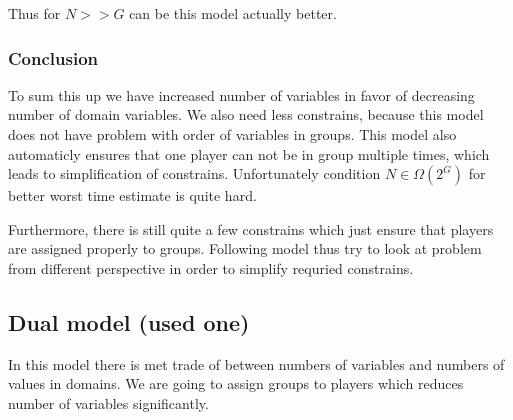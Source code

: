 \documentclass[a4paper]{article}
\theoremstyle{definition}
\theoremstyle{remark}
\begin{document}
Thus for $N >> G$ can be this model actually better.

\subsubsection{Conclusion}
To sum this up we have increased number of variables in favor of decreasing number of domain variables.
We also need less constrains, because this model does not have problem with order of
variables in groups. This model also automaticly ensures that one player
can not be in group multiple times, which leads to simplification of constrains.
Unfortunately condition $N \in \Omega(2^G)$ for better worst time estimate is quite hard.

Furthermore, there is still quite a few constrains which just ensure that players
are assigned properly to groups. Following model thus try to look at problem from
different perspective in order to simplify requried constrains.

\subsection{Dual model (used one)}
In this model there is met trade of between numbers of variables and numbers of values in domains.
We are going to assign groups to players which reduces number of variables significantly.
\end{document}
